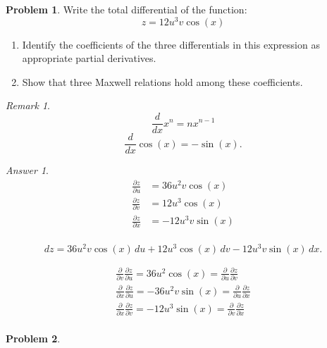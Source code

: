 \documentclass[a4paper, 12pt]{article}
\theoremstyle{definition}
\newtheorem{problem}{Problem}[section]
\theoremstyle{remark}
\newtheorem*{remark}{Remark}
\newtheorem*{answer}{Answer}
\begin{document}
\begin{problem}
    Write the total differential of the function:
    \[ z = 12 u^3 v \cos(x) \]

    \begin{enumerate}
        \item Identify the coefficients of the three differentials in this
            expression as appropriate partial derivatives.
        \item Show that three Maxwell relations hold among these coefficients.
    \end{enumerate}
    
    \begin{remark}
        \[ \frac{d}{dx} x^n = n x^{n - 1} \]
        \[ \frac{d}{dx} \cos(x) = -\sin(x).\]
    \end{remark}

    \begin{answer}
        \begin{align*}
            \frac{\partial z}{\partial u} &= 36 u^2 v \cos(x) \\
            \frac{\partial z}{\partial v} &= 12 u^3 \cos(x) \\
            \frac{\partial z}{\partial x} &= -12 u^3 v \sin(x) \\
        \end{align*}

        \[ dz = 36 u^2 v \cos(x) \,du
            + 12 u^3 \cos(x) \,dv
            - 12 u^3 v \sin(x) \,dx.\]

        \[
            \begin{gathered}
                \frac\partial{\partial v}\frac{\partial z}{\partial u}
                    = 36 u^2 \cos(x)
                    = \frac\partial{\partial u}\frac{\partial z}{\partial v} \\
                \frac\partial{\partial x}\frac{\partial z}{\partial u}
                    = -36 u^2 v \sin(x)
                    = \frac\partial{\partial u}\frac{\partial z}{\partial x} \\
                \frac\partial{\partial x}\frac{\partial z}{\partial v}
                    = -12 u^3 \sin(x)
                    = \frac\partial{\partial v}\frac{\partial z}{\partial x} \\
            \end{gathered}
        \]
    \end{answer}
\end{problem}

\begin{problem}
\end{problem}
\end{document}
